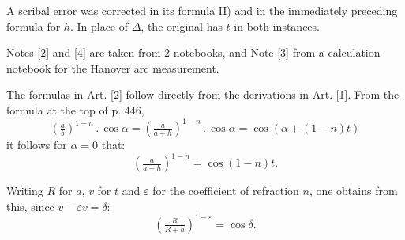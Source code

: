 A scribal error was corrected in its formula II) and in the immediately preceding formula for \(h\).
In place of \(\Delta\), the original has \(t\) in both instances.
\par\noindent\hspace*{\parindent}Notes [2] and [4] are taken from 2 notebooks, and Note [3] from a
calculation notebook for the Hanover arc measurement.
\par\noindent\hspace*{\parindent}The formulas in Art. [2] follow directly from the derivations
in Art. [1]. From the formula at the top of p. 446,
\[
\left(\tfrac ab\right)^{1-n}\mathbin{.}\cos\alpha
=\left(\tfrac{a}{a+h}\right)^{1-n}\mathbin{.}\cos\alpha
=\cos(\alpha+(1-n)t)
\]
\noindent it follows for \(\alpha=0\) that:
\[
\left(\tfrac{a}{a+h}\right)^{1-n}=\cos(1-n)t.
\]
\par\noindent\hspace*{\parindent}Writing \(R\) for \(a\), \(v\) for \(t\) and
\(\varepsilon\) for the coefficient of refraction \(n\), one obtains from this,
since \(v-\varepsilon v=\delta\):
\[
\left(\tfrac{R}{R+h}\right)^{1-\varepsilon}=\cos\delta.
\]
\endgroup

